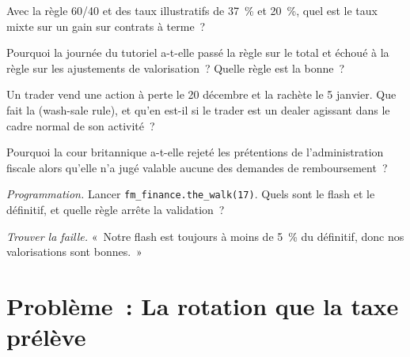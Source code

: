 \begin{exercise}[$\star$]\label{exo:fm:finance-product-control-and-tax:3}
Avec la règle 60/40 et des taux illustratifs de 37~\% et 20~\%, quel est le taux mixte sur un gain sur contrats à terme~?
\end{exercise}

\begin{exercise}[$\star\star$]\label{exo:fm:finance-product-control-and-tax:4}
Pourquoi la journée du tutoriel a-t-elle passé la règle sur le total et échoué à la règle sur les ajustements de valorisation~? Quelle règle est la bonne~?
\end{exercise}

\begin{exercise}[$\star\star$]\label{exo:fm:finance-product-control-and-tax:5}
Un trader vend une action à perte le 20 décembre et la rachète le 5 janvier. Que fait la  (wash-sale rule), et qu'en est-il si le trader est un dealer
agissant dans le cadre normal de son activité~?
\end{exercise}

\begin{exercise}[$\star\star$]\label{exo:fm:finance-product-control-and-tax:6}
Pourquoi la cour britannique a-t-elle rejeté les prétentions de l'administration fiscale alors qu'elle n'a jugé valable aucune des demandes de remboursement~?
\end{exercise}

\begin{exercise}[$\star\star\star$]\label{exo:fm:finance-product-control-and-tax:7}
\emph{Programmation.} Lancer \texttt{fm\_finance.the\_walk(17)}. Quels sont le flash et le définitif, et quelle règle arrête la validation~?
\end{exercise}

\begin{exercise}[$\star\star\star$]\label{exo:fm:finance-product-control-and-tax:8}
\emph{Trouver la faille.} «~Notre flash est toujours à moins de 5~\% du définitif, donc nos valorisations sont bonnes.~»
\end{exercise}

\section{Problème~: La rotation que la taxe prélève}

